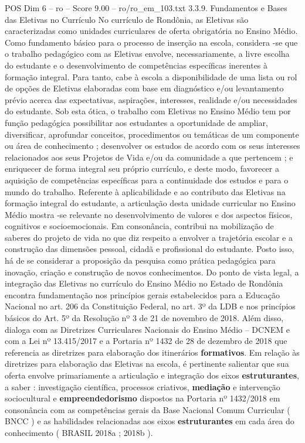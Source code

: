 \begin{textsample}{POS Dim 6 – ro – Score 9.00 – ro/ro\_em\_103.txt}  \label{ex:f6_pos_139}
3.3.9.
Fundamentos e Bases das Eletivas no Currículo No currículo de Rondônia, as Eletivas são caracterizadas como unidades curriculares de oferta obrigatória no Ensino Médio.
Como fundamento básico para o processo de inserção na escola, considera -se que o trabalho pedagógico com as Eletivas envolve, necessariamente, a livre escolha do estudante e o desenvolvimento de competências específicas inerentes à formação integral.
Para tanto, cabe à escola a disponibilidade de uma lista ou rol de opções de Eletivas elaboradas com base em diagnóstico e/ou levantamento prévio acerca das expectativas, aspirações, interesses, realidade e/ou necessidades do estudante.
Sob esta ótica, o trabalho com Eletivas no Ensino Médio tem por função pedagógica possibilitar aos estudantes a oportunidade de ampliar, diversificar, aprofundar conceitos, procedimentos ou temáticas de um componente ou área de conhecimento ; desenvolver os estudos de acordo com os seus interesses relacionados aos seus Projetos de Vida e/ou da comunidade a que pertencem ; e enriquecer de forma integral seu próprio currículo, e deste modo, favorecer a aquisição de competências específicas para a continuidade dos estudos e para o mundo do trabalho.
Referente à aplicabilidade e ao contributo das Eletivas na formação integral do estudante, a articulação desta unidade curricular no Ensino Médio mostra -se relevante no desenvolvimento de valores e dos aspectos físicos, cognitivos e socioemocionais.
Em consonância, contribui na mobilização de saberes do projeto de vida no que diz respeito a envolver a trajetória escolar e a construção das dimensões pessoal, cidadã e profissional do estudante.
Posto isso, há de se considerar a proposição da pesquisa como prática pedagógica para inovação, criação e construção de novos conhecimentos.
Do ponto de vista legal, a integração das Eletivas no currículo do Ensino Médio no Estado de Rondônia encontra fundamentação nos princípios gerais estabelecidos para a Educação Nacional no art. 206 da Constituição Federal, no art. 3º da LDB e nos princípios básicos do Art. 5º da Resolução nº 3 de 21 de novembro de 2018.
Além disso, dialoga com as Diretrizes Curriculares Nacionais do Ensino Médio – DCNEM e com a Lei nº 13.415/2017 e a Portaria nº 1432 de 28 de dezembro de 2018 que referencia as diretrizes para elaboração dos itinerários \textbf{formativos}.
Em relação às diretrizes para elaboração das Eletivas na escola, é pertinente salientar que sua oferta envolve primariamente a articulação e integração dos eixos \textbf{estruturantes}, a saber : investigação científica, processos criativos, \textbf{mediação} e intervenção sociocultural e \textbf{empreendedorismo} dispostos na Portaria nº 1432/2018 em consonância com as competências gerais da Base Nacional Comum Curricular ( BNCC ) e as habilidades relacionadas aos eixos \textbf{estruturantes} em cada área do conhecimento ( BRASIL 2018a ; 2018b ).

\end{textsample}
